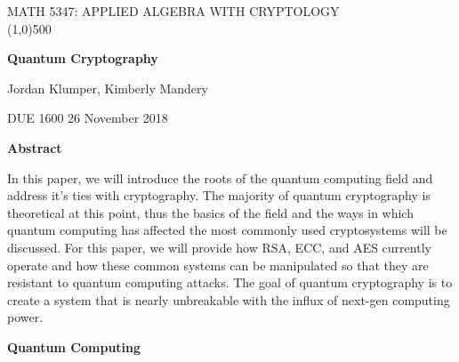 \documentclass[12pt]{article}
\begin{document}
              
\begin{titlepage}
\begin{centering}
	
	MATH 5347: APPLIED ALGEBRA WITH CRYPTOLOGY\\

 \line(1,0){500}

\end{centering}

	\par\vspace{3mm}

\begin{centering}
	{\bf Quantum Cryptography }
	\par\vspace{1mm}
	{ Jordan Klumper, Kimberly Mandery}
	\par\vspace{1mm}
	{ DUE 1600 26 November 2018}
	\large
	\par\vspace{10mm}
	{\bf Abstract}

\end{centering}
	
\hspace{10pt}

In this paper, we will introduce the roots of the quantum computing field and address it's ties with cryptography. The majority of quantum cryptography is theoretical at this point, thus the basics of the field and the ways in which quantum computing has affected the most commonly used cryptosystems will be discussed. For this paper, we will provide how RSA, ECC, and AES currently operate and how these common systems can be manipulated so that they are resistant to quantum computing attacks.
The goal of quantum cryptography is to create a system that is nearly unbreakable with the influx of next-gen computing power.
\end{titlepage}
\newpage

\begin{center}
	{\large \bf Quantum Computing}
\end{center}
\end{document}
